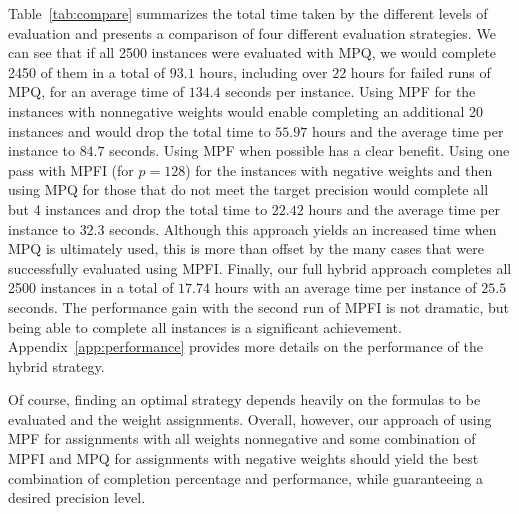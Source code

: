 \documentclass[letterpaper,USenglish,cleveref, autoref, thm-restate]{lipics-v2021}
\begin{document}
\begin{table}
  \caption{Performance Comparison of Different Implementation Strategies.  Run entries of the form $S$+$F$ indicate that $S$ runs
  were successful and $F$ runs either ran out of memory or failed to meet the target precision.}
  \label{tab:compare}
\end{table}

Table~\ref{tab:compare} summarizes the total time taken by the
different levels of evaluation and presents a comparison of four
different evaluation strategies.  We can see that if all 2500
instances were evaluated with MPQ, we would complete 2450 of them in a
total of $93.1$ hours, including over $22$ hours for failed runs of MPQ, for an average time of $134.4$ seconds per
instance.  Using MPF for the instances with nonnegative weights would
enable completing an additional 20 instances and would drop the total
time to $55.97$ hours and the average time per instance to $84.7$ seconds.
Using MPF when possible has a clear benefit.  Using one pass with MPFI
(for $p=128$) for the instances with negative weights and then using
MPQ for those that do not meet the target precision would complete all
but 4 instances and drop the total time to $22.42$ hours and the
average time per instance to $32.3$ seconds.  Although this approach yields
an increased time when MPQ is ultimately used, this is more than
offset by the many cases that were successfully evaluated using
MPFI\@.  Finally, our full hybrid approach completes all 2500
instances in a total of $17.74$ hours with an average time per instance of
$25.5$ seconds.  The performance gain with the second run of MPFI is
not dramatic, but being able to complete all instances is a significant
achievement.
Appendix~\ref{app:performance} provides more details on the performance of the hybrid strategy.

Of course, finding an optimal strategy depends heavily on the formulas
to be evaluated and the weight assignments.  Overall, however, our
approach of using MPF for assignments with all weights nonnegative and
some combination of MPFI and MPQ for assignments with negative weights
should yield the best combination of completion percentage and
performance, while guaranteeing a desired precision level.
\end{document}
